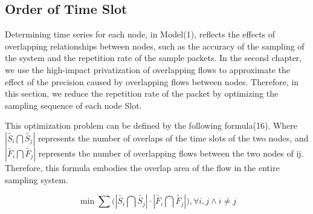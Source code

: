 \documentclass[conference,compsoc]{IEEEtran}
\begin{document}
\subsection{Order of Time Slot}

Determining time series for each node, in Model(1), reflects the effects of overlapping relationships between nodes, such as the accuracy of the sampling of the system and the repetition rate of the sample packets. In the second chapter, we use the high-impact privatization of overlapping flows to approximate the effect of the precision caused by overlapping flows between nodes. Therefore, in this section, we reduce the repetition rate of the packet by optimizing the sampling sequence of each node Slot.

This optimization problem can be defined by the following formula(16). Where $ \left| \widetilde{{{S}_{i}}}\bigcap \widetilde{{{S}_{j}}} \right| $ represents the number of overlaps of the time slots of the two nodes, and $\left| \widetilde{{{F}_{i}}}\bigcap \widetilde{{{F}_{j}}} \right|$ represents the number of overlapping flows between the two nodes of ij. Therefore, this formula embodies the overlap area of the flow in the entire sampling system.

\begin{equation}
\min \sum{(\left| \widetilde{{{S}_{i}}}\bigcap \widetilde{{{S}_{j}}} \right|}\cdot \left| \widetilde{{{F}_{i}}}\bigcap \widetilde{{{F}_{j}}} \right|),\forall i,j\wedge i\ne j
\end{equation}
\end{document}
